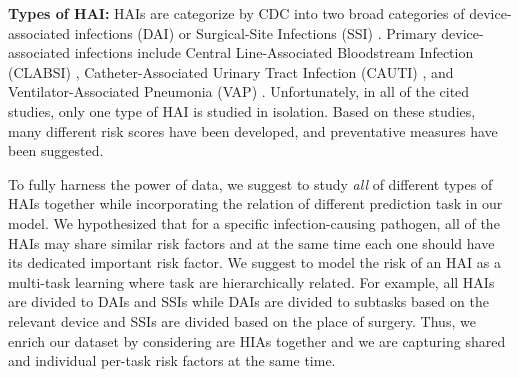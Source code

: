 {\bf Types of HAI:}
HAIs are categorize by CDC into two broad categories of device-associated infections (DAI) or Surgical-Site Infections (SSI) \cite{mu2011improving, de2006surgical, friedman2007alternative, chiang2014risk}. Primary device-associated infections include Central Line-Associated Bloodstream Infection (CLABSI) \cite{wylie2010risk, noaman2017improving, schoonover2017accurately, herc2017model, parreco2018predicting}, Catheter-Associated Urinary Tract Infection (CAUTI) \cite{grana2015detection, tambyah2004catheter, siddiq2012new}, and Ventilator-Associated Pneumonia (VAP) \cite{froon1998prediction, larsson2017risk, lisboa2008ventilator, kruger2011prognosis, mirsaeidi2009predicting}. Unfortunately, in all of the cited studies, only one type of HAI is studied in isolation. Based on these studies, many different risk scores have been developed, and preventative measures have been suggested. 

To fully harness the power of data, we suggest to study \emph{all} of different types of HAIs together while incorporating the relation of different prediction task in our model. We hypothesized that for a specific infection-causing pathogen, all of the HAIs may share similar risk factors and at the same time each one should have its dedicated important risk factor. We suggest to model the risk of an HAI as a multi-task learning where task are hierarchically related. For example, all HAIs are divided to DAIs and SSIs while DAIs are divided to subtasks based on the relevant device and SSIs are divided based on the place of surgery. Thus, we enrich our dataset by considering are HIAs together and we are capturing shared and individual per-task risk factors at the same time. 


